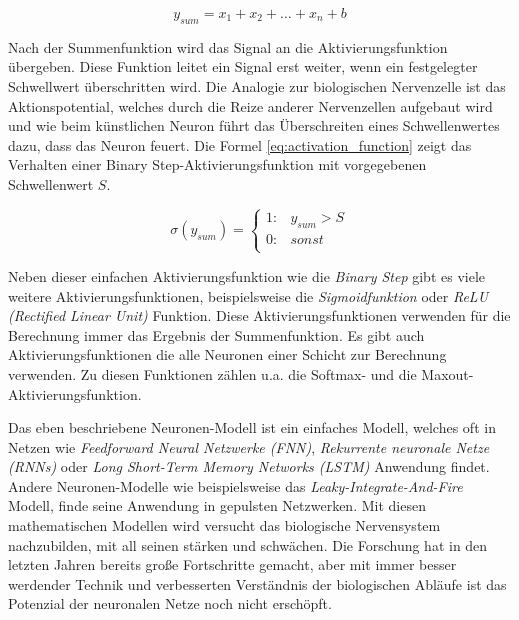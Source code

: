 \begin{equation} \label{eq:sum_function}
	y_{sum} = x_{1} + x_{2} + \dots + x_{n} + b
\end{equation}

Nach der Summenfunktion wird das Signal an die Aktivierungsfunktion übergeben. Diese Funktion leitet ein Signal erst weiter, wenn ein festgelegter Schwellwert überschritten wird. Die Analogie zur biologischen Nervenzelle ist das Aktionspotential, welches durch die Reize anderer Nervenzellen aufgebaut wird und wie beim künstlichen Neuron führt das Überschreiten eines Schwellenwertes dazu, dass das Neuron \glqq feuert\grqq. Die Formel \ref{eq:activation_function} zeigt das Verhalten einer \glqq Binary Step\grqq -Aktivierungsfunktion mit vorgegebenen Schwellenwert $S$.\vspace{0.2cm}

\begin{equation}\label{eq:activation_function}
	\sigma (y_{sum}) = \left\{
	\begin{array}{cl}
		1: & y_{sum} > S \\
		0: & sonst \\
	\end{array}
	\right.
\end{equation}

Neben dieser einfachen Aktivierungsfunktion wie die \textit{Binary Step} gibt es viele weitere Aktivierungsfunktionen, beispielsweise die \textit{Sigmoidfunktion} oder \textit{ReLU (Rectified Linear Unit)} Funktion. Diese Aktivierungsfunktionen verwenden für die Berechnung immer das Ergebnis der Summenfunktion. Es gibt auch Aktivierungsfunktionen die alle Neuronen einer Schicht zur Berechnung verwenden. Zu diesen Funktionen zählen u.a. die Softmax- und die Maxout-Aktivierungsfunktion.\vspace{0.2cm}

Das eben beschriebene Neuronen-Modell ist ein einfaches Modell, welches oft in Netzen wie \textit{Feedforward Neural Netzwerke (FNN)}, \textit{Rekurrente neuronale Netze (RNNs)} oder \textit{Long Short-Term Memory Networks (LSTM)} Anwendung findet. Andere Neuronen-Modelle wie beispielsweise das \textit{Leaky-Integrate-And-Fire} Modell, finde seine Anwendung in gepulsten Netzwerken. Mit diesen mathematischen Modellen wird versucht das biologische Nervensystem nachzubilden, mit all seinen stärken und schwächen. Die Forschung hat in den letzten Jahren bereits große Fortschritte gemacht, aber mit immer besser werdender Technik und verbesserten Verständnis der biologischen Abläufe ist das Potenzial der neuronalen Netze noch nicht erschöpft.


